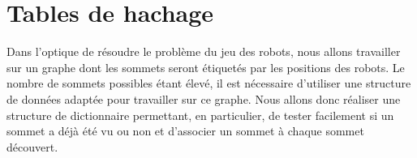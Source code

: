 
\section{Tables de hachage}
Dans l’optique de résoudre le problème du jeu des robots, nous allons
travailler sur un graphe dont les sommets seront étiquetés par les
positions des robots. Le nombre de sommets possibles étant élevé, il est
nécessaire d’utiliser une structure de données adaptée pour
travailler sur ce graphe. Nous allons donc réaliser une structure
de dictionnaire permettant, en particulier, de tester facilement si un
sommet a déjà été vu ou non et d’associer un sommet à chaque sommet
découvert.


